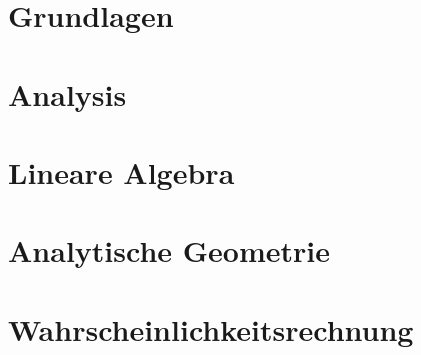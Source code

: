 \part{Grundlagen}




\part{Analysis}








\part{Lineare Algebra}



\part{Analytische Geometrie}






\part{Wahrscheinlichkeitsrechnung}




 
